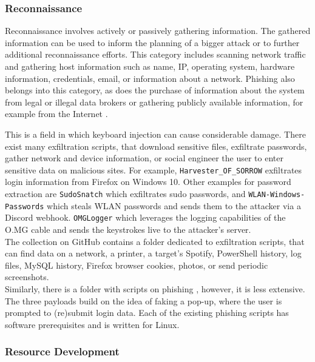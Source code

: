 \subsubsection{Reconnaissance}

Reconnaissance involves actively or passively gathering information. The gathered information can be used to inform the planning
of a bigger attack or to further additional reconnaissance efforts. This category includes scanning network traffic and gathering host information such as name, IP, operating system,
hardware information, credentials, email, or information about a network. Phishing also belongs into this category, as does the purchase of information about the system from legal
or illegal data brokers or gathering publicly available information, for example from the Internet \cite{MITREATTCK}.

This is a field in which keyboard injection can cause considerable damage. There exist many exfiltration scripts, that download sensitive files, exfiltrate passwords,
gather network and device information, or social engineer the user to enter sensitive data on malicious sites.
For example, \verb|Harvester_OF_SORROW| \cite{OmgpayloadsPayloadsLibrary} exfiltrates login information from Firefox on Windows 10. Other examples for password extraction are \verb|SudoSnatch| \cite{OmgpayloadsPayloadsLibrary} which exfiltrates sudo passwords, and \verb|WLAN-Windows-Passwords| \cite{OmgpayloadsPayloadsLibrary}which steals WLAN passwords and sends them to the attacker via a Discord webhook. 
\verb|OMGLogger| \cite{OmgpayloadsPayloadsLibrary} which leverages the logging capabilities of the O.MG cable and sends the keystrokes live to the attacker's server. \\
The collection on GitHub contains a folder dedicated to exfiltration scripts, that can find data on a network, a printer, a target's Spotify, PowerShell history, log files, MySQL history,
Firefox browser cookies, photos, or send periodic screenshots. \\
Similarly, there is a folder with scripts on phishing  \cite{OmgpayloadsPayloadsLibrary}, however, it is less extensive. The three payloads build on the idea of faking a pop-up,
where the user is prompted to (re)submit login data. Each of the existing phishing scripts has software prerequisites and is written for Linux. \\


\subsubsection{Resource Development}

